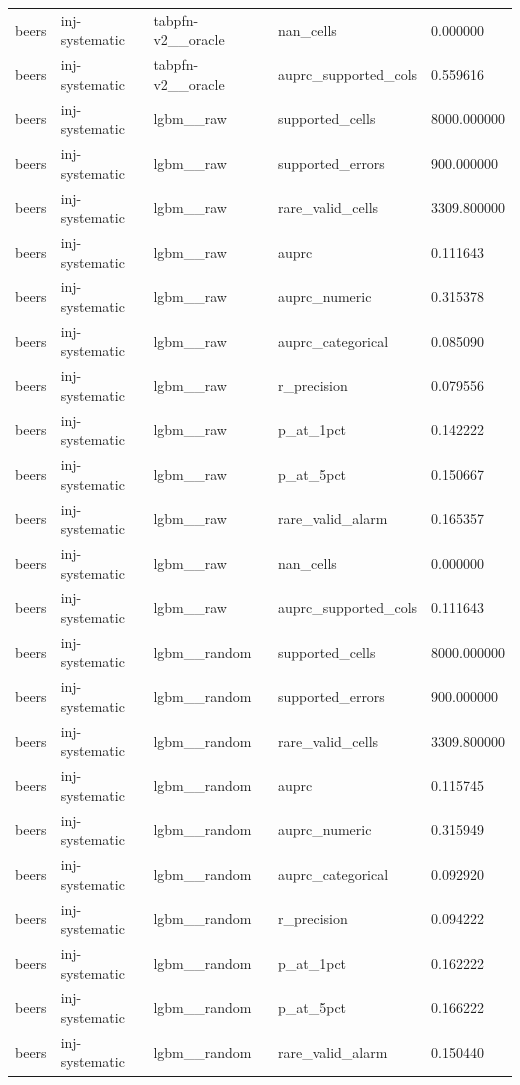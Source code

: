 \begin{tabular}{lllll}
beers & inj-systematic & tabpfn-v2\_\_oracle & nan\_cells & 0.000000 \\
beers & inj-systematic & tabpfn-v2\_\_oracle & auprc\_supported\_cols & 0.559616 \\
beers & inj-systematic & lgbm\_\_raw & supported\_cells & 8000.000000 \\
beers & inj-systematic & lgbm\_\_raw & supported\_errors & 900.000000 \\
beers & inj-systematic & lgbm\_\_raw & rare\_valid\_cells & 3309.800000 \\
beers & inj-systematic & lgbm\_\_raw & auprc & 0.111643 \\
beers & inj-systematic & lgbm\_\_raw & auprc\_numeric & 0.315378 \\
beers & inj-systematic & lgbm\_\_raw & auprc\_categorical & 0.085090 \\
beers & inj-systematic & lgbm\_\_raw & r\_precision & 0.079556 \\
beers & inj-systematic & lgbm\_\_raw & p\_at\_1pct & 0.142222 \\
beers & inj-systematic & lgbm\_\_raw & p\_at\_5pct & 0.150667 \\
beers & inj-systematic & lgbm\_\_raw & rare\_valid\_alarm & 0.165357 \\
beers & inj-systematic & lgbm\_\_raw & nan\_cells & 0.000000 \\
beers & inj-systematic & lgbm\_\_raw & auprc\_supported\_cols & 0.111643 \\
beers & inj-systematic & lgbm\_\_random & supported\_cells & 8000.000000 \\
beers & inj-systematic & lgbm\_\_random & supported\_errors & 900.000000 \\
beers & inj-systematic & lgbm\_\_random & rare\_valid\_cells & 3309.800000 \\
beers & inj-systematic & lgbm\_\_random & auprc & 0.115745 \\
beers & inj-systematic & lgbm\_\_random & auprc\_numeric & 0.315949 \\
beers & inj-systematic & lgbm\_\_random & auprc\_categorical & 0.092920 \\
beers & inj-systematic & lgbm\_\_random & r\_precision & 0.094222 \\
beers & inj-systematic & lgbm\_\_random & p\_at\_1pct & 0.162222 \\
beers & inj-systematic & lgbm\_\_random & p\_at\_5pct & 0.166222 \\
beers & inj-systematic & lgbm\_\_random & rare\_valid\_alarm & 0.150440 \\

\end{tabular}
